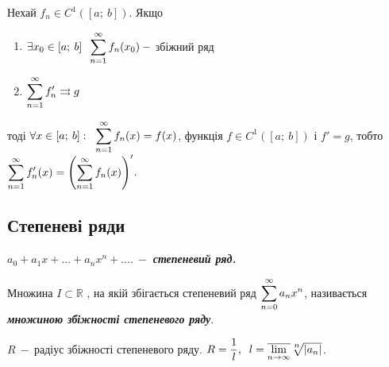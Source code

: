 \begin{theorem} 
Нехай $f_n \in C^1([a; \: b])$. Якщо
       \begin{enumerate}
           \item $\exists x_0 \in [a; \: b] \; \; \displaystyle\sum\limits_{n=1}^{\infty} f_n(x_0) \: - $ збіжний ряд
           \item  $\displaystyle\sum\limits_{n=1}^{\infty} f'_n \rightrightarrows g $
       \end{enumerate}
тоді $\forall x \in [a; \: b]: \;\; \displaystyle\sum\limits_{n=1}^{\infty} f_n(x)= f(x)$, функція $f \in C^1([a; \: b])$ і $f' = g$, тобто   $\displaystyle\sum\limits_{n=1}^{\infty} f'_n (x)= \left(\displaystyle\sum\limits_{n=1}^{\infty} f_n(x)\right)' $.


\end{theorem} 


\subsection{\large{Степеневі ряди}}
$a_0 + a_1x+...+ a_nx^n+.... \: - $  \textcolor{NavyBlue}{\textbf{\textit{степеневий ряд. }}}

\begin{definition}
    Множина $I \subset \mathbb{R}$ , на якій збігається степеневий ряд $\displaystyle\sum\limits_{n=0}^{\infty} a_nx^n$,  називається \textcolor{NavyBlue}{\textbf{\textit{множиною \newline збіжності степеневого ряду}}}.
\end{definition}

\begin{theorem} 
$R \: - \ $радіус збіжності степеневого ряду. $R = \dfrac{1}{l},\;\; l = \overline{\Lim_{n \to \infty}} \sqrt[\leftroot{-1}\uproot{2}\scriptstyle n]{|a_n|}$.
\end{theorem}

